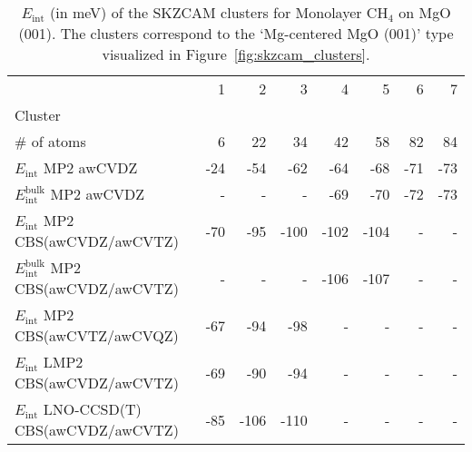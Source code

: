 \begin{table}
\caption{\label{tab:system_eint_mgo_ch4_monolayer}$E_\textrm{int}$ (in meV) of the SKZCAM clusters for Monolayer CH$_4$ on MgO (001). The clusters correspond to the `Mg-centered MgO (001)' type visualized in Figure~\ref{fig:skzcam_clusters}.}
\begin{adjustbox}{center,max width=1.4\textwidth}
\begin{tabular}{lrrrrrrr}
\toprule
 & 1 & 2 & 3 & 4 & 5 & 6 & 7 \\ 
Cluster &  &  &  &  &  &  &  \\
\midrule
\# of atoms & 6 & 22 & 34 & 42 & 58 & 82 & 84 \\
$E_\textrm{int}$ MP2 awCVDZ & -24 & -54 & -62 & -64 & -68 & -71 & -73 \\
$E_\textrm{int}^\textrm{bulk}$ MP2 awCVDZ & - & - & - & -69 & -70 & -72 & -73 \\
$E_\textrm{int}$ MP2 CBS(awCVDZ/awCVTZ) & -70 & -95 & -100 & -102 & -104 & - & - \\
$E_\textrm{int}^\textrm{bulk}$ MP2 CBS(awCVDZ/awCVTZ) & - & - & - & -106 & -107 & - & - \\
$E_\textrm{int}$ MP2 CBS(awCVTZ/awCVQZ) & -67 & -94 & -98 & - & - & - & - \\
$E_\textrm{int}$ LMP2 CBS(awCVDZ/awCVTZ) & -69 & -90 & -94 & - & - & - & - \\
$E_\textrm{int}$ LNO-CCSD(T) CBS(awCVDZ/awCVTZ) & -85 & -106 & -110 & - & - & - & - \\
\bottomrule
\end{tabular}
\end{adjustbox}
\end{table}


